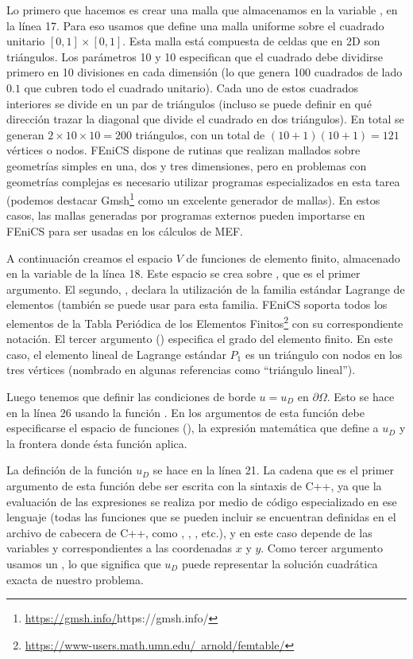 Lo primero que hacemos es crear una malla que almacenamos en la variable , en la línea 17. Para eso usamos  que define una malla uniforme sobre el cuadrado unitario $[0,1] \times [0,1]$. Esta malla está compuesta de celdas que en 2D son triángulos. Los parámetros 10 y 10 especifican que el cuadrado debe dividirse primero en 10 divisiones en cada dimensión (lo que genera 100 cuadrados de lado $0.1$ que cubren todo el cuadrado unitario). Cada uno de estos cuadrados interiores se divide en un par de triángulos (incluso se puede definir en qué dirección trazar la diagonal que divide el cuadrado en dos triángulos). En total se generan $2 \times 10 \times 10 = 200$ triángulos, con un total de $(10 + 1) (10 + 1) = 121$ vértices o nodos. FEniCS dispone de rutinas que realizan mallados sobre geometrías simples en una, dos y tres dimensiones, pero en problemas con geometrías complejas es necesario utilizar programas especializados en esta tarea (podemos destacar Gmsh\footnote{\url{https://gmsh.info/}{https://gmsh.info/}} como un excelente generador de mallas). En estos casos, las mallas generadas por programas externos pueden importarse en FEniCS para ser usadas en los cálculos de MEF.

A continuación creamos el espacio $V$ de funciones de elemento finito, almacenado en la variable  de la línea 18. Este espacio se crea sobre , que es el primer argumento. El segundo, , declara la utilización de la familia estándar Lagrange de elementos (también se puede usar  para esta familia. FEniCS soporta todos los elementos de la Tabla Periódica de los Elementos Finitos\footnote{\href{https://www-users.math.umn.edu/~arnold/femtable/}{https://www-users.math.umn.edu/~arnold/femtable/}} \cite{arnold2014} con su correspondiente notación. El tercer argumento () especifica el grado del elemento finito. En este caso, el elemento lineal de Lagrange estándar $P_1$ es un triángulo con nodos en los tres vértices (nombrado en algunas referencias como ``triángulo lineal''). 

Luego tenemos que definir las condiciones de borde $u = u_D$ en $\partial \Omega$. Esto se hace en la línea 26 usando la función . En los argumentos de esta función debe especificarse el espacio de funciones (), la expresión matemática que define a $u_D$ y la frontera donde ésta función aplica. 

La definción de la función $u_D$ se hace en la línea 21. La cadena que es el primer argumento de esta función debe ser escrita con la sintaxis de C++, ya que la evaluación de las expresiones se realiza por medio de código especializado en ese lenguaje (todas las funciones que se pueden incluir se encuentran definidas en el archivo de cabecera  de C++, como , , , etc.), y en este caso depende de las variables  y  correspondientes a las coordenadas $x$ y $y$. Como tercer argumento usamos un , lo que significa que $u_D$ puede representar la solución cuadrática exacta de nuestro problema.

